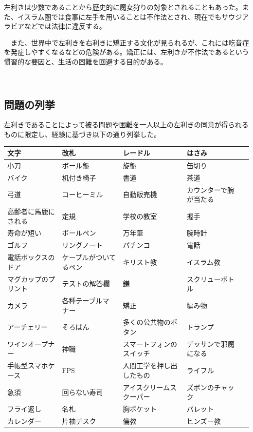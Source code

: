 \documentclass{jsarticle}
\begin{document}
  左利きは少数であることから歴史的に魔女狩りの対象とされることもあった。また、イスラム圏では食事に左手を用いることは不作法とされ\cite{kitaoka}、現在でもサウジアラビアなどでは法律に違反する。

　また、世界中で左利きを右利きに矯正する文化が見られるが、これには吃音症を発症しやすくなるなどの危険がある。矯正には、左利きが不作法であるという慣習的な要因と、生活の困難を回避する目的がある。

　
\newpage
\subsection{問題の列挙}

左利きであることによって被る問題や困難を一人以上の左利きの同意が得られるものに限定し、経験に基づき以下の通り列挙した。

\begin{table}[H]
  \begin{tabular}{|l|l|l|l|l|}\hline
  文字 & 改札 &  レードル &  はさみ \\ \hline
  小刀 &ボール盤 &  旋盤 &  缶切り \\\hline
  バイク &  机付き椅子 &  書道 &  茶道\\\hline
  弓道 &  コーヒーミル &  自動販売機 &  カウンターで腕が当たる\\\hline
  高齢者に馬鹿にされる &  定規 &  学校の教室 &  握手 \\\hline
  寿命が短い &  ボールペン &  万年筆 &  腕時計\\\hline
  ゴルフ &  リングノート &  パチンコ &  電話 \\\hline
  電話ボックスのドア &  ケーブルがついてるペン &  キリスト教 &  イスラム教 \\\hline
  マグカップのプリント &  テストの解答欄 &  鎌 &スクリューボトル \\\hline
  カメラ &  各種テーブルマナー &  矯正 &  編み物 \\\hline
  アーチェリー &  そろばん &  多くの公共物のボタン &  トランプ \\\hline
  ワインオープナー &  神職 &  スマートフォンのスイッチ &  デッサンで邪魔になる \\\hline
  手帳型スマホケース &  FPS &  人間工学を押し出したもの &  ライフル \\\hline
  急須 &  回らない寿司 &  アイスクリームスクーパー &  ズボンのチャック\\\hline
  フライ返し &  名札 &  胸ポケット &  パレット \\\hline
  カレンダー &  片袖デスク &  儒教 &  ヒンズー教 \\\hline

\end{tabular}
\end{table}
\end{document}
